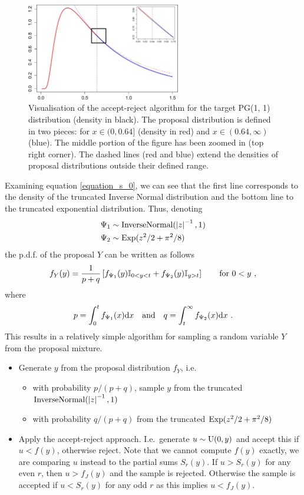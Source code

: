 \documentclass[a4paper]{article}\usepackage[]{graphicx}\usepackage[]{color}
\begin{document}
\begin{figure}[ht]
\centering
\includegraphics[width=0.6\textwidth]{fig_accept_reject_final}
\caption{Visualisation of the accept-reject algorithm for the target PG(1, 1) distribution (density in black). The proposal distribution is defined in two pieces: for $x \in (0, 0.64]$ (density in red) and $x \in (0.64, \infty)$ (blue). The middle portion of the figure has been zoomed in (top right corner). The dashed lines (red and blue) extend the densities of proposal distributions outside their defined range.}
\label{figure_sample_and_proposal}
\end{figure}

Examining equation \eqref{equation_s_0}, we can see that the first line corresponds to the density of the truncated Inverse Normal distribution and the bottom line to the truncated exponential distribution. Thus, denoting
\begin{align}
\Psi_1&\sim\textup{InverseNormal}(\left|z\right|^{-1},1) \\
\Psi_2&\sim\textup{Exp}(z^2/2+\pi^2/8)
\end{align}
the p.d.f. of the proposal $Y$ can be written as follows
\begin{equation}
f_Y(y)=\frac{1}{p+q}\left[
f_{\Psi_1}(y)\mathbb{I}_{0<y<t}+f_{\Psi_2}(y)\mathbb{I}_{y>t}
\right] \qquad \textup{for } 0<y \ ,
\end{equation}
where
\begin{equation}
p = \int_{0}^{t} f_{\Psi_1}(x) \textup{d}x \quad \textup{and} \quad
q = \int_{t}^{\infty} f_{\Psi_2}(x) \textup{d}x \ .
\end{equation}
This results in a relatively simple algorithm for sampling a random variable $Y$ from the proposal mixture.
\begin{itemize}
\item Generate $y$ from the proposal distribution $f_Y$, i.e.
  \begin{itemize}
  \item with probability $p/(p+q)$, sample $y$ from the truncated  $\textup{InverseNormal}(\left|z\right|^{-1},1)$
  \item with probability $q/(p+q)$ from the truncated $\textup{Exp}(z^2/2+\pi^2/8)$
  \end{itemize}
\item Apply the accept-reject approach. I.e.~generate $u\sim\textup{U}(0,y)$ and  accept this if $u<f(y)$, otherwise reject. Note that we cannot compute $f(y)$ exactly, we are comparing $u$ instead to the partial sums $S_r(y)$. If $u>S_r(y)$ for any even $r$, then $u>f_J(y)$ and the sample is rejected. Otherwise the sample is accepted if $u<S_r(y)$ for any odd $r$ as this implies $u<f_J(y)$.
\end{itemize}
\end{document}
